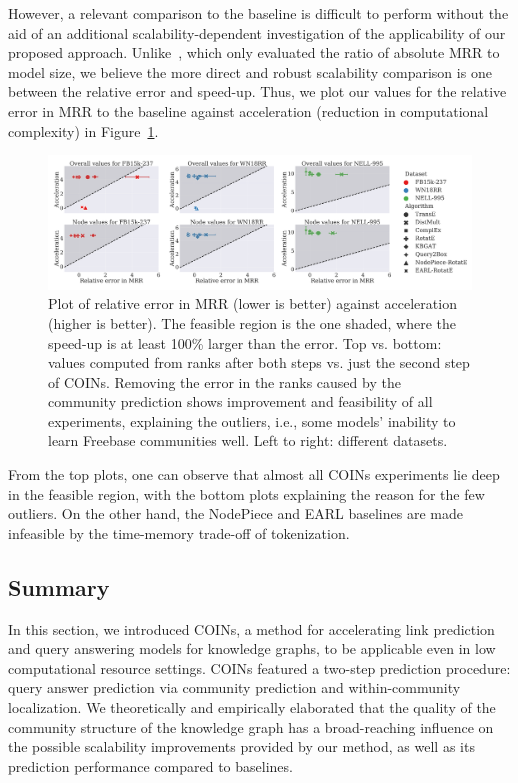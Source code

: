 However, a relevant comparison to the baseline is difficult to perform without the aid of an additional scalability-dependent investigation of the applicability of our proposed approach. Unlike~\cite{chen_entity-agnostic_2023}, which only evaluated the ratio of absolute MRR to model size, we believe the more direct and robust scalability comparison is one between the relative error and speed-up. Thus, we plot our values for the relative error in MRR to the baseline against acceleration (reduction in computational complexity) in Figure~\ref{fig:feasibility}. 

\begin{figure}[ht!]
\begin{center}
\includegraphics[width=\textwidth]{figures/coins/feasibility_2.pdf}
\end{center}
\caption[Plot of relative error in MRR against acceleration.]{Plot of relative error in MRR (lower is better) against acceleration (higher is better). The feasible region is the one shaded, where the speed-up is at least 100\% larger than the error. Top vs. bottom: values computed from ranks after both steps vs. just the second step of COINs. Removing the error in the ranks caused by the community prediction shows improvement and feasibility of all experiments, explaining the outliers, i.e., some models' inability to learn Freebase communities well. Left to right: different datasets.}
\label{fig:feasibility}
\end{figure}

From the top plots, one can observe that almost all COINs experiments lie deep in the feasible region, with the bottom plots explaining the reason for the few outliers. On the other hand, the NodePiece and EARL baselines are made infeasible by the time-memory trade-off of tokenization.

\subsection{Summary}

In this section, we introduced COINs, a method for accelerating link prediction and query answering models for knowledge graphs, to be applicable even in low computational resource settings. COINs featured a two-step prediction procedure: query answer prediction via community prediction and within-community localization. We theoretically and empirically elaborated that the quality of the community structure of the knowledge graph has a broad-reaching influence on the possible scalability improvements provided by our method, as well as its prediction performance compared to baselines. 

